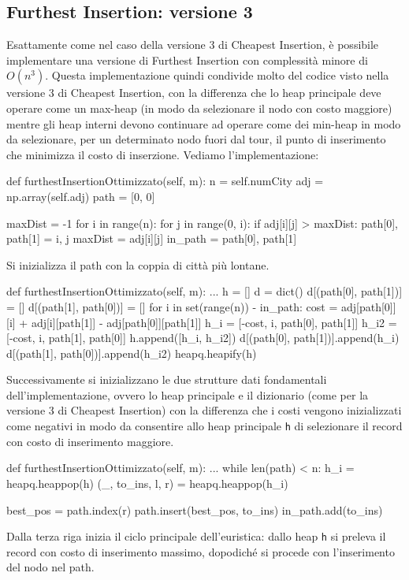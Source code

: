 \documentclass[a4paper,12pt]{report}
\begin{document}
\subsection{Furthest Insertion: versione 3}
Esattamente come nel caso della versione 3 di Cheapest Insertion, è possibile implementare una versione di Furthest Insertion con complessità minore di $O(n^3)$. Questa implementazione quindi condivide molto del codice visto nella versione 3 di Cheapest Insertion, con la differenza che lo heap principale deve operare come un max-heap (in modo da selezionare il nodo con costo maggiore) mentre gli heap interni devono continuare ad operare come dei min-heap in modo da selezionare, per un determinato nodo fuori dal tour, il punto di inserimento che minimizza il costo di inserzione. Vediamo l'implementazione:
\begin{python}
def furthestInsertionOttimizzato(self, m):
  n = self.numCity
  adj = np.array(self.adj)
  path = [0, 0]

  maxDist = -1
  for i in range(n):
    for j in range(0, i):
      if adj[i][j] > maxDist:
        path[0], path[1] = i, j
        maxDist = adj[i][j]
  in_path = {path[0], path[1]}
\end{python}
Si inizializza il path con la coppia di città più lontane.
\begin{python}
def furthestInsertionOttimizzato(self, m):
  ...
  h = []
  d = dict()
  d[(path[0], path[1])] = []
  d[(path[1], path[0])] = []
  for i in set(range(n)) - in_path:
    cost = adj[path[0]][i] + adj[i][path[1]] - adj[path[0]][path[1]]
    h_i = [-cost, i, path[0], path[1]]
    h_i2 = [-cost, i, path[1], path[0]]
    h.append([h_i, h_i2])
    d[(path[0], path[1])].append(h_i)
    d[(path[1], path[0])].append(h_i2)
  heapq.heapify(h)
\end{python}
Successivamente si inizializzano le due strutture dati fondamentali dell'implementazione, ovvero lo heap principale e il dizionario (come per la versione 3 di Cheapest Insertion) con la differenza che i costi vengono inizializzati come negativi in modo da consentire allo heap principale \lstinline!h! di selezionare il record con costo di inserimento maggiore.
\begin{python}
def furthestInsertionOttimizzato(self, m):
  ...
  while len(path) < n:
    h_i = heapq.heappop(h)
    (_, to_ins, l, r) = heapq.heappop(h_i)

    best_pos = path.index(r)
    path.insert(best_pos, to_ins)
    in_path.add(to_ins)
\end{python}
Dalla terza riga inizia il ciclo principale dell'euristica: dallo heap \lstinline!h! si preleva il record con costo di inserimento massimo, dopodiché si procede con l'inserimento del nodo nel path.
\end{document}
